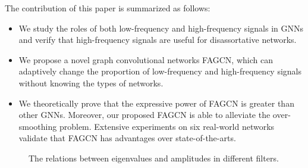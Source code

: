 \documentclass[letterpaper]{article} %
\begin{document}

The contribution of this paper is summarized as follows:
\begin{itemize}
	\item We study the roles of both low-frequency and high-frequency signals in GNNs and verify that high-frequency signals are useful for disassortative networks.
	\item We propose a novel graph convolutional networks FAGCN, which can adaptively change the proportion of low-frequency and high-frequency signals without knowing the types of networks.
	\item We theoretically prove that the expressive power of FAGCN is greater than other GNNs. Moreover, our proposed FAGCN is able to alleviate the over-smoothing problem. Extensive experiments on six real-world networks validate that FAGCN has advantages over state-of-the-arts.
\end{itemize}

\begin{figure}
\centering
{}
\caption{The relations between eigenvalues and amplitudes in different filters.}
\label{functions}
\end{figure}
\end{document}
